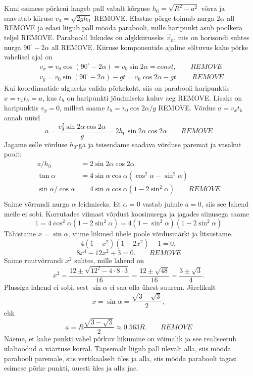 \documentclass[10pt]{article}
\newcommand{\p}[1]{REMOVE}
\begin{document}
Kuni esimese põrkeni langeb pall vabalt kõrguse $h_0=\sqrt{R^2-a^2}$ võrra ja saavutab kiiruse $v_0=\sqrt{2gh_0}$ \p{1}. Elastne põrge toimub nurga $2\alpha$ all \p{1} ja edasi liigub pall mööda parabooli, mille haripunkt asub poolkera teljel \p{1}. Paraboolil liikudes on algkkiiruseks $\vec v_0$, mis on horisondi suhtes nurga $90^\circ-2\alpha$ all \p{1}. Kiiruse komponentide ajaline sõltuvus kahe põrke vahelisel ajal on
\begin{align*}
    &v_x=v_0\cos(90^\circ-2\alpha)=v_0\sin 2\alpha=const, \qquad\p{1}\\
    &v_y=v_0\sin(90^\circ-2\alpha)-gt=v_0\cos 2\alpha-gt. \qquad\p{1}
\end{align*}
Kui koordinaatide alguseks valida põrkekoht, siis on parabooli haripunktis $x=v_xt_h=a$, kus $t_h$ on haripunkti jõudmiseks kuluv aeg \p{1}. Lisaks on haripunktis $v_y=0$, millest saame
$t_h=v_0\cos 2\alpha/g$ \p{1}. Võrdus $a=v_xt_h$ annab nüüd
\[a=\frac{v_0^2\sin2\alpha\cos 2\alpha}{g}=2h_0\sin2\alpha\cos 2\alpha\qquad \p{1}\]
Jagame selle võrduse $h_0$-ga ja teisendame saadava võrduse paremat ja vasakut poolt:
\begin{align*}
a/h_0&=2\sin2\alpha\cos 2\alpha\\
\tan\alpha&=4\sin\alpha\cos\alpha(\cos^2\alpha-\sin^2\alpha)\\
\sin\alpha/\cos\alpha&=4\sin\alpha\cos\alpha(1-2\sin^2\alpha)\qquad \p{1}\\
\end{align*}
Saime võrrandi nurga $\alpha$ leidmiseks. Et $\alpha=0$ vastab juhule $a=0$, siis see lahend meile ei sobi. Korrutades viimast võrdust koosinusega ja jagades siinusega saame
\[1=4\cos^2\alpha(1-2\sin^2\alpha)=4(1-\sin^2\alpha)(1-2\sin^2\alpha)\]
Tähistame $x=\sin\alpha$, viime liikmed ühele poole võrdusmärki ja litsustame.
\[4(1-x^2)(1-2x^2)-1=0,\]
\[8x^4-12x^2+3=0.\qquad \p{2}\]
Saime ruutvõrrandi $x^2$ suhtes, mille lahend on
\[x^2=\frac{12\pm\sqrt{12^2-4\cdot8\cdot3}}{16}=\frac{12\pm\sqrt{48}}{16}=\frac{3\pm\sqrt{3}}{4}.\]
Plussiga lahend ei sobi, sest $\sin\alpha$ ei saa olla ühest suurem. Järelikult
\[x=\sin\alpha=\frac{\sqrt{3-\sqrt{3}}}{2},\]
ehk
\[a=R\frac{\sqrt{3-\sqrt{3}}}{2}\approx\num{0.563}R.\qquad \p{1}\]
Näeme, et kahe punkti vahel põrkuv liikumine on võimalik ja see realiseerub ülaltoodud $a$ väärtuse korral. Täpsemalt liigub pall ülevalt alla, siis mööda parabooli paremale, siis vertikaalselt üles ja alla, siis mööda parabooli tagasi esimese põrke punkti, uuesti üles ja alla jne.
\end{document}
